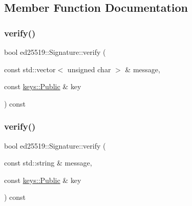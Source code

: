 \subsection{Member Function Documentation}
\mbox{\label{classed25519_1_1_signature_aca2ff60a3e305730cd62e7005b92cfef}} 
\subsubsection{\texorpdfstring{verify()}{verify()}\hspace{0.1cm}{\footnotesize\ttfamily [1/3]}}
{\footnotesize\ttfamily bool ed25519\+::\+Signature\+::verify (\begin{DoxyParamCaption}\item[{const std\+::vector$<$ unsigned char $>$ \&}]{message,  }\item[{const \mbox{\hyperlink{classed25519_1_1keys_1_1_public}{keys\+::\+Public}} \&}]{key }\end{DoxyParamCaption}) const}

\mbox{\label{classed25519_1_1_signature_a365b186127ea5150dd233c9c89ac4faf}} 
\subsubsection{\texorpdfstring{verify()}{verify()}\hspace{0.1cm}{\footnotesize\ttfamily [2/3]}}
{\footnotesize\ttfamily bool ed25519\+::\+Signature\+::verify (\begin{DoxyParamCaption}\item[{const std\+::string \&}]{message,  }\item[{const \mbox{\hyperlink{classed25519_1_1keys_1_1_public}{keys\+::\+Public}} \&}]{key }\end{DoxyParamCaption}) const}

\mbox{\label{classed25519_1_1_signature_a906ffca7764e7879438a9c60d96ff207}} 
